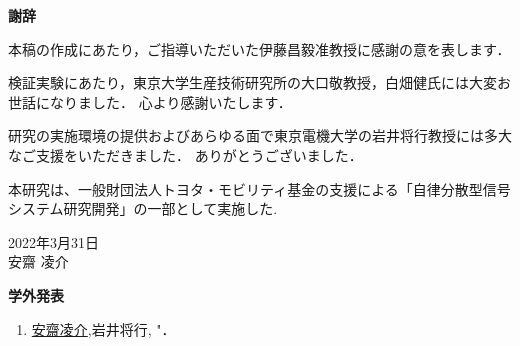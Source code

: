 \newpage
\pagestyle{plain}


\begin{flushleft}
{\huge{\bf 謝辞}}\\
 \vspace{1cm}
 
 本稿の作成にあたり，ご指導いただいた伊藤昌毅准教授に感謝の意を表します．

 検証実験にあたり，東京大学生産技術研究所の大口敬教授，白畑健氏には大変お世話になりました．
 心より感謝いたします．

 研究の実施環境の提供およびあらゆる面で東京電機大学の岩井将行教授には多大なご支援をいただきました．
 ありがとうございました．

 本研究は、一般財団法人トヨタ・モビリティ基金の支援による「自律分散型信号システム研究開発」の一部として実施した.
\vspace{3cm}
\begin{flushright}
2022年3月31日\\
安齋 凌介\\
\end{flushright}
\end{flushleft}



\newpage




\begin{flushleft}
{\huge{\bf 学外発表}}\\
\vspace{1cm}
\begin{enumerate}

\item \underline{安齋凌介},岩井将行, "．


\end{enumerate}
\end{flushleft}

\newpage

\renewcommand{\bibname}{参考文献}







\newpage
